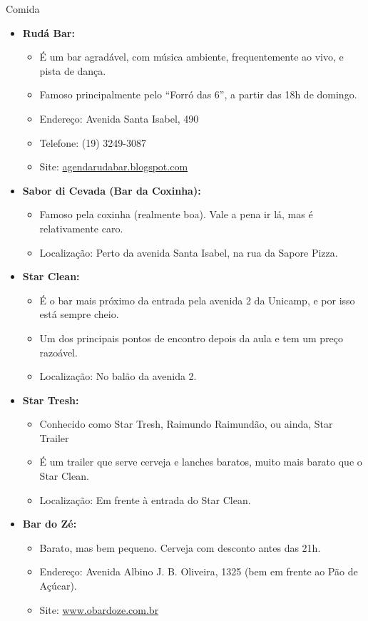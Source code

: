 \begin{story}{Comida}
\begin{itemize}
\item \textbf{Rudá Bar:}
\begin{itemize}
\item É um bar agradável, com música ambiente, frequentemente ao vivo, e pista de dança.
\item Famoso principalmente pelo ``Forró das 6'', a partir das 18h de domingo.
\item Endereço: Avenida Santa Isabel, 490
\item Telefone: (19) 3249-3087
\item Site: \url{agendarudabar.blogspot.com}
\end{itemize}

\item \textbf{Sabor di Cevada (Bar da Coxinha):}
\begin{itemize}
\item Famoso pela coxinha (realmente boa). Vale a pena ir lá, mas é relativamente caro.
\item Localização: Perto da avenida Santa Isabel, na rua da Sapore Pizza.
\end{itemize}

\item \textbf{Star Clean:}
\begin{itemize}
\item É o bar mais próximo da entrada pela avenida 2 da Unicamp, e por isso está sempre cheio.
\item Um dos principais pontos de encontro depois da aula e tem um preço razoável.
\item Localização: No balão da avenida 2.
\end{itemize}

\item \textbf{Star Tresh:}
\begin{itemize}
\item Conhecido como Star Tresh, Raimundo Raimundão, ou ainda, Star Trailer
\item É um trailer que serve cerveja e lanches baratos, muito mais barato que o Star Clean.
\item Localização: Em frente à entrada do Star Clean.
\end{itemize}

\item \textbf{Bar do Zé:}
\begin{itemize}
\item Barato, mas bem pequeno. Cerveja com desconto antes das 21h.
\item Endereço: Avenida Albino J. B. Oliveira, 1325 (bem em frente ao Pão de Açúcar).
\item Site: \url{www.obardoze.com.br}
\end{itemize}

\end{itemize}

\end{story}

